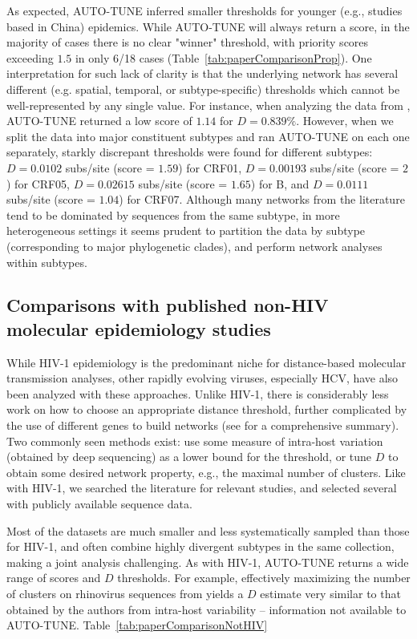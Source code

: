 \documentclass[utf8]{FrontiersinHarvard} %
\begin{document}
As expected, AUTO-TUNE inferred smaller thresholds for younger (e.g., studies
based in China) epidemics. While AUTO-TUNE will always return a score, in the
majority of cases there is no clear "winner" threshold, with priority scores
exceeding $1.5$ in only 6/18 cases (Table~\ref{tab:paperComparisonProp}). One
interpretation for such lack of clarity is that the underlying network has
several different (e.g. spatial, temporal, or subtype-specific) thresholds
which cannot be well-represented by any single value. For instance, when
analyzing the data from \citet{Yan:2021aa}, AUTO-TUNE returned a low score of
$1.14$ for $D=0.839\%$. However, when we split the data into major constituent
subtypes and ran AUTO-TUNE on each one separately, starkly discrepant
thresholds were found for different subtypes: $D=0.0102$ subs/site (score = $1.59$) for
CRF01, $D=0.00193$ subs/site (score = $2$) for CRF05, $D=0.02615$ subs/site (score = $1.65$) for B,
and $D=0.0111$ subs/site (score = $1.04$) for CRF07. Although many networks from the
literature tend to be dominated by sequences from the same subtype, in more
heterogeneous settings it seems prudent to partition the data by subtype
(corresponding to major phylogenetic clades), and perform network analyses
within subtypes.

\subsection{Comparisons with published non-HIV molecular epidemiology studies}

While HIV-1 epidemiology is the predominant niche for distance-based molecular
transmission analyses, other rapidly evolving viruses, especially HCV, have
also been analyzed with these approaches\citep{bartlett2017molecular}. Unlike HIV-1, there is considerably
less work on how to choose an appropriate distance threshold, further
complicated by the use of different genes to build networks (see
\citet{Chan:2020aa} for a comprehensive summary). Two commonly seen methods
exist: use some measure of intra-host variation (obtained by deep sequencing)
as a lower bound for the threshold, or tune $D$ to obtain some desired network
property, e.g., the maximal number of clusters. Like with HIV-1, we searched
the literature for relevant studies, and selected several with publicly
available sequence data.

Most of the datasets are much smaller and less systematically sampled than
those for HIV-1, and often combine highly divergent subtypes in the same
collection, making a joint analysis challenging. As with HIV-1, AUTO-TUNE
returns a wide range of scores and $D$ thresholds. For example, effectively
maximizing the number of clusters on rhinovirus sequences from
\citet{Ng:2022aa} yields a $D$ estimate very similar to that obtained by the
authors from intra-host variability -- information not available to AUTO-TUNE.
Table~\ref{tab:paperComparisonNotHIV}
\end{document}

